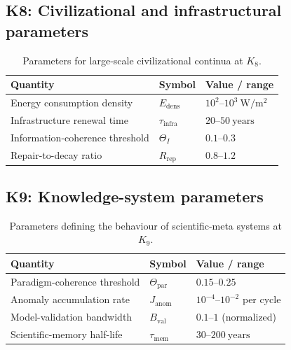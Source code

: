 
\subsection*{K8: Civilizational and infrastructural parameters}

\begin{table}[htbp]
  \centering
  \caption{Parameters for large-scale civilizational continua at \(K_8\).}
  \label{tab:k8-civilizational-parameters}
  \begin{tabular}{@{}L{0.44\textwidth}L{0.16\textwidth}L{0.23\textwidth}@{}}
    \hline
    Quantity & Symbol & Value / range \\
    \hline
    Energy consumption density & \(E_\mathrm{dens}\)
        & \(10^2\text{–}10^3~\mathrm{W/m^2}\) \\
    Infrastructure renewal time & \(\tau_\mathrm{infra}\)
        & \(20\text{–}50~\mathrm{years}\) \\
    Information-coherence threshold & \(\Theta_I\)
        & \(0.1\text{–}0.3\) \\
    Repair-to-decay ratio & \(R_\mathrm{rep}\)
        & \(0.8\text{–}1.2\) \\
    \hline
  \end{tabular}
\end{table}


\subsection*{K9: Knowledge-system parameters}

\begin{table}[htbp]
  \centering
  \caption{Parameters defining the behaviour of scientific-meta systems at \(K_9\).}
  \label{tab:k9-knowledge-parameters}
  \begin{tabular}{@{}L{0.44\textwidth}L{0.16\textwidth}L{0.23\textwidth}@{}}
    \hline
    Quantity & Symbol & Value / range \\
    \hline
    Paradigm-coherence threshold & \(\Theta_{\mathrm{par}}\)
        & \(0.15\text{–}0.25\) \\
    Anomaly accumulation rate & \(J_\mathrm{anom}\)
        & \(10^{-4}\text{–}10^{-2}\) per cycle \\
    Model-validation bandwidth & \(B_\mathrm{val}\)
        & \(0.1\text{–}1\) (normalized) \\
    Scientific-memory half-life & \(\tau_\mathrm{mem}\)
        & \(30\text{–}200~\mathrm{years}\) \\
    \hline
  \end{tabular}
\end{table}

